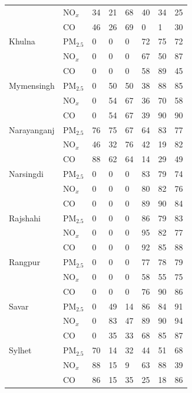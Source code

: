 \begin{longtable}{L{3.4cm} L{1.2cm} C{1.0cm} C{1.0cm} C{1.0cm} C{1.0cm} C{1.0cm} C{1.0cm}}
 & NO$_x$ & 34 & 21 & 68 & 40 & 34 & 25 \\
 & CO & 46 & 26 & 69 & 0 & 1 & 30 \\
Khulna & PM$_{2.5}$ & 0 & 0 & 0 & 72 & 75 & 72 \\
 & NO$_x$ & 0 & 0 & 0 & 67 & 50 & 87 \\
 & CO & 0 & 0 & 0 & 58 & 89 & 45 \\
Mymensingh & PM$_{2.5}$ & 0 & 50 & 50 & 38 & 88 & 85 \\
 & NO$_x$ & 0 & 54 & 67 & 36 & 70 & 58 \\
 & CO & 0 & 54 & 67 & 39 & 90 & 90 \\
Narayanganj & PM$_{2.5}$ & 76 & 75 & 67 & 64 & 83 & 77 \\
 & NO$_x$ & 46 & 32 & 76 & 42 & 19 & 82 \\
 & CO & 88 & 62 & 64 & 14 & 29 & 49 \\
Narsingdi & PM$_{2.5}$ & 0 & 0 & 0 & 83 & 79 & 74 \\
 & NO$_x$ & 0 & 0 & 0 & 80 & 82 & 76 \\
 & CO & 0 & 0 & 0 & 89 & 90 & 84 \\
Rajshahi & PM$_{2.5}$ & 0 & 0 & 0 & 86 & 79 & 83 \\
 & NO$_x$ & 0 & 0 & 0 & 95 & 82 & 77 \\
 & CO & 0 & 0 & 0 & 92 & 85 & 88 \\
Rangpur & PM$_{2.5}$ & 0 & 0 & 0 & 77 & 78 & 79 \\
 & NO$_x$ & 0 & 0 & 0 & 58 & 55 & 75 \\
 & CO & 0 & 0 & 0 & 76 & 90 & 86 \\
Savar & PM$_{2.5}$ & 0 & 49 & 14 & 86 & 84 & 91 \\
 & NO$_x$ & 0 & 83 & 47 & 89 & 90 & 94 \\
 & CO & 0 & 35 & 33 & 68 & 85 & 87 \\
Sylhet & PM$_{2.5}$ & 70 & 14 & 32 & 44 & 51 & 68 \\
 & NO$_x$ & 88 & 15 & 9 & 63 & 88 & 39 \\
 & CO & 86 & 15 & 35 & 25 & 18 & 86 \\
\end{longtable}
\endgroup
